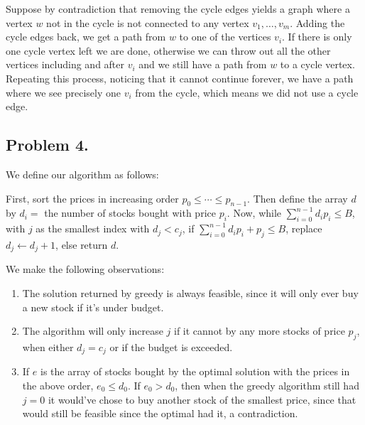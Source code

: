 \documentclass[12pt]{article}
\theoremstyle{definitionstyle}
\begin{document}
    Suppose by contradiction that removing the cycle edges yields a graph where a vertex $w$ not in the cycle is not connected to any vertex $v_1, \ldots, v_m$. Adding the cycle edges back, we get a path from $w$ to one of the vertices $v_i$. If there is only one cycle vertex left we are done, otherwise we can throw out all the other vertices including and after $v_i$ and we still have a path from $w$ to a cycle vertex. Repeating this process, noticing that it cannot continue forever, we have a path where we see precisely one $v_i$ from the cycle, which means we did not use a cycle edge.

    \subsection*{Problem 4.}
    We define our algorithm as follows:

    First, sort the prices in increasing order $p_0 \leq \cdots \leq p_{n-1}$. Then define the array $d$ by $d_i = $ the number of stocks bought with price $p_i$. Now, while $\sum_{i=0}^{n-1} d_ip_i \leq B$, with $j$ as the smallest index with $d_j < c_j$, if $\sum_{i=0}^{n-1} d_ip_i + p_j \leq B$, replace $d_j \leftarrow d_j + 1$, else return $d$. 

    We make the following observations: 
    \begin{enumerate}[label=(\arabic*)]
        \item The solution returned by greedy is always feasible, since it will only ever buy a new stock if it's under budget.
        \item The algorithm will only increase $j$ if it cannot by any more stocks of price $p_j$, when either $d_j = c_j$ or if the budget is exceeded.
        \item If $e$ is the array of stocks bought by the optimal solution with the prices in the above order, $e_0 \leq d_0$. If $e_0 > d_0$, then when the greedy algorithm still had $j=0$ it would've chose to buy another stock of the smallest price, since that would still be feasible since the optimal had it, a contradiction.
    \end{enumerate}
\end{document}
